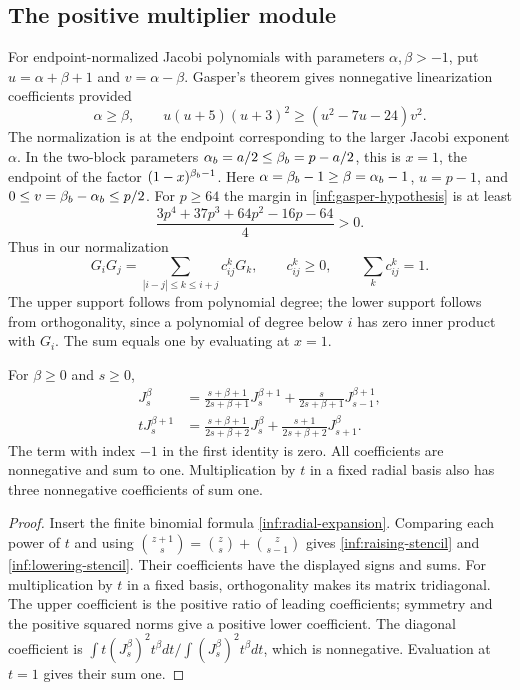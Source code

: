 \subsection{The positive multiplier module}

For endpoint-normalized Jacobi polynomials with parameters
$\alpha,\beta>-1$, put $u=\alpha+\beta+1$ and $v=\alpha-\beta$.
Gasper's theorem \cite[Theorem~1]{inf:gasper} gives nonnegative
linearization coefficients provided
\begin{equation}\label{inf:gasper-hypothesis}
 \alpha\ge\beta,\qquad
 u(u+5)(u+3)^2\ge(u^2-7u-24)v^2.
\end{equation}
The normalization is at the endpoint corresponding to the larger
Jacobi exponent $\alpha$. In the two-block parameters
$\alpha_b=a/2\le\beta_b=p-a/2$, this is $x=1$, the endpoint of the
factor $(1-x)^{\beta_b-1}$.
Here $\alpha=\beta_b-1\ge\beta=\alpha_b-1$, $u=p-1$, and
$0\le v=\beta_b-\alpha_b\le p/2$. For $p\ge64$ the margin in
\eqref{inf:gasper-hypothesis} is at least
\[
 \frac{3p^4+37p^3+64p^2-16p-64}{4}>0.
\]
Thus in our normalization
\begin{equation}\label{inf:gasper-product}
 G_iG_j=\sum_{|i-j|\le k\le i+j}c_{ij}^kG_k,
 \qquad c_{ij}^k\ge0,\qquad\sum_kc_{ij}^k=1.
\end{equation}
The upper support follows from polynomial degree; the lower support
follows from orthogonality, since a polynomial of degree below $i$
has zero inner product with $G_i$. The sum equals one by evaluating
at $x=1$.

\begin{lemma}\label{inf:radial-stencils}
For $\beta\ge0$ and $s\ge0$,
\begin{align}
 J_s^\beta&=\frac{s+\beta+1}{2s+\beta+1}J_s^{\beta+1}
              +\frac{s}{2s+\beta+1}J_{s-1}^{\beta+1},
 \label{inf:raising-stencil}\\
 tJ_s^{\beta+1}&=\frac{s+\beta+1}{2s+\beta+2}J_s^\beta
              +\frac{s+1}{2s+\beta+2}J_{s+1}^\beta.
 \label{inf:lowering-stencil}
\end{align}
The term with index $-1$ in the first identity is zero.
All coefficients are nonnegative and sum to one.
Multiplication by $t$ in a fixed radial basis also has three
nonnegative coefficients of sum one.
\end{lemma}
\begin{proof}
Insert the finite binomial formula
\eqref{inf:radial-expansion}. Comparing each power of $t$ and using
$\binom{z+1}{s}=\binom z s+\binom z{s-1}$ gives
\eqref{inf:raising-stencil} and \eqref{inf:lowering-stencil}.
Their coefficients have the displayed signs and sums.
For multiplication by $t$ in a fixed basis, orthogonality makes
its matrix tridiagonal. The upper coefficient is the positive
ratio of leading coefficients; symmetry and the positive squared
norms give a positive lower coefficient. The diagonal coefficient
is $\int t(J_s^\beta)^2t^\beta dt/\int(J_s^\beta)^2t^\beta dt$,
which is nonnegative. Evaluation at $t=1$ gives their sum one.
\end{proof}

